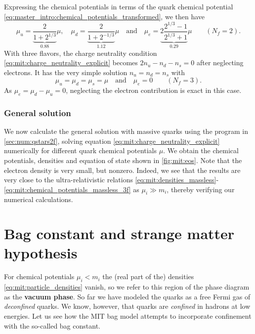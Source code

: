 Expressing the chemical potentials in terms of the quark chemical potential \eqref{eq:master_intro:chemical_potentials_transformed},
we then have
\begin{equation}
	\mu_u = \underbrace{\frac{2}{1+2^{1/3}}}_{0.88} \mu , \quad
	\mu_d = \underbrace{\frac{2}{1+2^{-1/3}}}_{1.12} \mu \quad \text{and} \quad
	\mu_e = \underbrace{2 \frac{2^{1/3}-1}{2^{1/3}+1}}_{0.29} \mu
	\qquad (N_f = 2) .
\label{eq:mit:chemical_potentials_massless_2f}
\end{equation}
With three flavors, the charge neutrality condition \eqref{eq:mit:charge_neutrality_explicit} becomes $2 n_u - n_d - n_s = 0$
after neglecting electrons.
It has the very simple solution $n_u = n_d = n_s$ with
\begin{equation}
	\mu_u = \mu_d = \mu_s = \mu
	\quad \text{and} \quad
	\mu_e = 0
	\qquad (N_f = 3) .
\label{eq:mit:chemical_potentials_massless_3f}
\end{equation}
As $\mu_e = \mu_d - \mu_u = 0$, neglecting the electron contribution is exact in this case.

\subsubsection{General solution}

We now calculate the general solution with massive quarks using the program in \cref{sec:num:qstars2f},
solving equation \eqref{eq:mit:charge_neutrality_explicit} numerically for different quark chemical potentials $\mu$.
We obtain the chemical potentials, densities and equation of state shown in \cref{fig:mit:eos}.
Note that the electron density is very small, but nonzero.
Indeed, we see that the results are very close to the ultra-relativistic relations
\eqref{eq:mit:densities_massless}-\eqref{eq:mit:chemical_potentials_massless_3f}
as $\mu_i \gg m_i$, thereby verifying our numerical calculations.


\section{Bag constant and strange matter hypothesis}

For chemical potentials $\mu_i < m_i$ the (real part of the) densities \eqref{eq:mit:particle_densities} vanish,
so we refer to this region of the phase diagram as the \textbf{vacuum phase}.
So far we have modeled the quarks as a free Fermi gas of \emph{deconfined} quarks.
We know, however, that quarks are \emph{confined} in hadrons at low energies.
Let us see how the MIT bag model attempts to incorporate confinement with the so-called bag constant.

